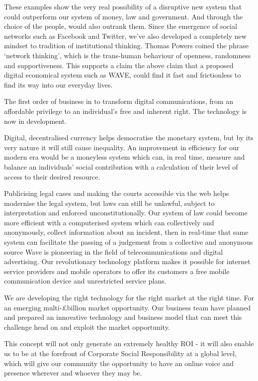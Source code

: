 \documentclass[letterpaper,10pt,openany,oneside,english]{sphinxmanual}
\begin{document}
These examples show the very real possibility of a disruptive new system that could outperform
our system of money, law and government. And through the choice of the people, would also
outrank them. Since the emergence of social networks such as Facebook and Twitter, we’ve also
developed a completely new mindset to tradition of institutional thinking. Thomas Powers
coined the phrase ‘network thinking’, which is the trans-human behaviour of openness,
randomness and supportiveness. This supports a claim the above claim that a proposed digital
economical system such as WAVE, could find it fast and frictionless to find its way into our
everyday lives.


The first order of business in to transform digital communications, from an affordable privilege
to an individual’s free and inherent right. The technology is now in development.

Digital, decentralised currency helps democratise the monetary system, but by its very nature it
will still cause inequality. An improvement in efficiency for our modern era would be a
moneyless system which can, in real time, measure and balance an individuals’ social
contribution with a calculation of their level of access to their desired resource.

Publicising legal cases and making the courts accessible via the web helps modernise the legal
system, but laws can still be unlawful, subject to interpretation and enforced unconstitutionally.
Our system of law could become more efficient with a computerised system which can
collectively and anonymously, collect information about an incident, then in real-time that same
system can facilitate the passing of a judgement from a collective and anonymous source
Wave is pioneering in the field of telecommunications and digital advertising. Our revolutionary
technology platform makes it possible for internet service providers and mobile operators to
offer its customers a free mobile communication device and unrestricted service plans.

We are developing the right technology for the right market at the right time. For an emerging
multi-£billion market opportunity. Our business team have planned and prepared an innovative
technology and business model that can meet this challenge head on and exploit the market
opportunity.

This concept will not only generate an extremely healthy ROI - it will also enable us to be at the
forefront of Corporate Social Responsibility at a global level, which will give our community the
opportunity to have an online voice and presence wherever and whoever they may be.
\end{document}
